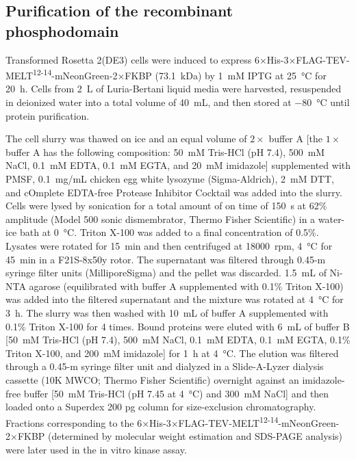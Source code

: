 \subsection{Purification of the recombinant  phosphodomain}
Transformed Rosetta\texttrademark{} 2(DE3) cells were induced to express 6×His-3×FLAG-TEV-MELT\textsuperscript{12-14}-mNeonGreen-2×FKBP (\SI{73.1}{kDa}) by \SI{1}{mM} IPTG at \SI{25}{\celsius} for \SI{20}{h}. Cells from \SI{2}{L} of Luria-Bertani liquid media were harvested, resuspended in deionized water into a total volume of \SI{40}{mL}, and then stored at \SI{-80}{\celsius} until protein purification.

The cell slurry was thawed on ice and an equal volume of $2\times$ buffer A [the $1\times$ buffer A has the following composition: \SI{50}{mM} Tris-HCl (pH 7.4), \SI{500}{mM} NaCl, \SI{0.1}{mM} EDTA, \SI{0.1}{mM} EGTA, and \SI{20}{mM} imidazole] supplemented with PMSF, \SI{0.1}{mg/mL} chicken egg white lysozyme (Sigma-Aldrich), \SI{2}{mM} DTT, and cOmplete\texttrademark{} EDTA-free Protease Inhibitor Cocktail was added into the slurry. Cells were lysed by sonication for a total amount of on time of \SI{150}{s} at 62\% amplitude (Model 500 sonic dismembrator, Thermo Fisher Scientific) in a water-ice bath at \SI{0}{\celsius}. Triton X-100 was added to a final concentration of 0.5\%. Lysates were rotated for \SI{15}{min} and then centrifuged at \SI{18000}{rpm}, \SI{4}{\celsius} for \SI{45}{min} in a F21S-8x50y rotor. The supernatant was filtered through 0.45-\textmu{}m syringe filter units (MilliporeSigma) and the pellet was discarded. \SI{1.5}{mL} of Ni-NTA agarose (equilibrated with buffer A supplemented with 0.1\% Triton X-100) was added into the filtered supernatant and the mixture was rotated at \SI{4}{\celsius} for \SI{3}{h}. The slurry was then washed with \SI{10}{mL} of buffer A supplemented with 0.1\% Triton X-100 for 4 times. Bound proteins were eluted with \SI{6}{mL} of buffer B [\SI{50}{mM} Tris-HCl (pH 7.4), \SI{500}{mM} NaCl, \SI{0.1}{mM} EDTA, \SI{0.1}{mM} EGTA, 0.1\% Triton X-100, and \SI{200}{mM} imidazole] for \SI{1}{h} at \SI{4}{\celsius}. The elution was filtered through a 0.45-\textmu{}m syringe filter unit and dialyzed in a Slide-A-Lyzer\texttrademark{} dialysis cassette (10K MWCO; Thermo Fisher Scientific) overnight against an imidazole-free buffer [\SI{50}{mM} Tris-HCl (pH 7.45 at \SI{4}{\celsius}) and \SI{300}{mM} NaCl] and then loaded onto a Superdex 200 pg column for size-exclusion chromatography. Fractions corresponding to the 6×His-3×FLAG-TEV-MELT\textsuperscript{12-14}-mNeonGreen-2×FKBP (determined by molecular weight estimation and SDS-PAGE analysis) were later used in the in vitro kinase assay.


